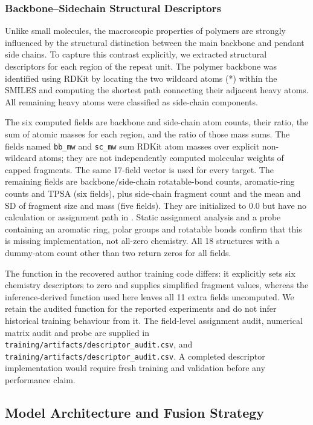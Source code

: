 \documentclass{article}
\begin{document}
\subsubsection{Backbone--Sidechain Structural Descriptors}

Unlike small molecules, the macroscopic properties of polymers are strongly influenced by the structural distinction between the main backbone and pendant side chains. To capture this contrast explicitly, we extracted structural descriptors for each region of the repeat unit. The polymer backbone was identified using RDKit by locating the two wildcard atoms (*) within the SMILES and computing the shortest path connecting their adjacent heavy atoms. All remaining heavy atoms were classified as side-chain components.

The six computed fields are backbone and side-chain atom counts, their ratio, the sum of atomic masses for each region, and the ratio of those mass sums. The fields named \texttt{bb\_mw} and \texttt{sc\_mw} sum RDKit atom masses over explicit non-wildcard atoms; they are not independently computed molecular weights of capped fragments. The same 17-field vector is used for every target. The remaining fields are backbone/side-chain rotatable-bond counts, aromatic-ring counts and TPSA (six fields), plus side-chain fragment count and the mean and SD of fragment size and mass (five fields). They are initialized to 0.0 but have no calculation or assignment path in . Static assignment analysis and a probe containing an aromatic ring, polar groups and rotatable bonds confirm that this is missing implementation, not all-zero chemistry. All 18 structures with a dummy-atom count other than two return zeros for all fields.

The function in the recovered author training code differs: it explicitly sets six chemistry descriptors to zero and supplies simplified fragment values, whereas the inference-derived function used here leaves all 11 extra fields uncomputed. We retain the audited function for the reported experiments and do not infer historical training behaviour from it. The field-level assignment audit, numerical matrix audit and probe are supplied in \texttt{training/artifacts/descriptor_audit.csv},  and \texttt{training/artifacts/descriptor_audit.csv}. A completed descriptor implementation would require fresh training and validation before any performance claim.

\subsection{Model Architecture and Fusion Strategy}
\label{sec:model_structure}
\end{document}
